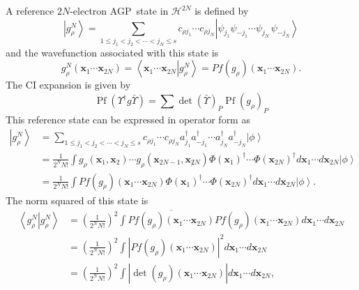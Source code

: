 \documentclass[aps,preprint]{revtex4}%
\begin{document}
A reference $2N$-electron AGP\ state in $\mathcal{H}^{2N}$ is defined by
\begin{equation}
\left\vert g_{\rho}^{N}\right\rangle =\sum_{1\leq j_{1}<j_{2}<\cdots<j_{N}\leq
s}c_{\rho j_{1}}\cdots c_{\rho j_{N}}\left\vert \psi_{j_{1}}\psi_{-j_{1}%
}\cdots\psi_{j_{N}\,}\psi_{-j_{N}}\right\rangle \label{canexp}%
\end{equation}
and the wavefunction associated with this state is
\begin{equation}
g_{\rho}^{N}\left(  \mathbf{x}_{1}\cdots\mathbf{x}_{2N}\right)  =\left\langle
\mathbf{x}_{1}\cdots\mathbf{x}_{2N}\left\vert g_{\rho}^{N}\right.
\right\rangle =Pf\left(  g_{\rho}\right)  \left(  \mathbf{x}_{1}%
\cdots\mathbf{x}_{2N}\right)  .
\end{equation}
The CI expansion is given by
\begin{equation}
\operatorname*{Pf}\left(  \Upsilon^{\dagger}g\bar{\Upsilon}\right)  =\sum
\det\left(  \bar{\Upsilon}\right)  _{P}\operatorname*{Pf}\left(  g_{\rho
}\right)  _{P}%
\end{equation}
This reference state can be expressed in operator form as
\begin{align}
\left\vert g_{\rho}^{N}\right\rangle  &  =\sum_{1\leq j_{1}<j_{2}<\cdots
<j_{N}\leq s}c_{\rho j_{1}}\cdots c_{\rho j_{N}}a_{j_{1}}^{\dagger}a_{-j_{1}%
}^{\dagger}\cdots a_{j_{N}}^{\dagger}a_{-j_{N}}^{\dagger}\left\vert
\phi\right\rangle \nonumber\\
&  =\frac{1}{2^{N}N!}\int g_{\rho}\left(  \mathbf{x}_{1},\mathbf{x}%
_{2}\right)  \cdots g_{\rho}\left(  \mathbf{x}_{2N-1},\mathbf{x}_{\not 2
N}\right)  \Phi\left(  \mathbf{x}_{1}\right)  ^{\dagger}\cdots\Phi\left(
\mathbf{x}_{2N}\right)  ^{\dagger}d\mathbf{x}_{1}\cdots d\mathbf{x}%
_{2N}\left\vert \phi\right\rangle \nonumber\\
&  =\frac{1}{2^{N}N!}\int Pf\left(  g_{\rho}\right)  \left(  \mathbf{x}%
_{1}\cdots\mathbf{x}_{2N}\right)  \Phi\left(  \mathbf{x}_{1}\right)
^{\dagger}\cdots\Phi\left(  \mathbf{x}_{2N}\right)  ^{\dagger}d\mathbf{x}%
_{1}\cdots d\mathbf{x}_{2N}\left\vert \phi\right\rangle .
\end{align}
The norm squared of this state is
\begin{align}
\left\langle g_{\rho}^{N}\left\vert g_{\rho}^{N}\right.  \right\rangle  &
=\left(  \frac{1}{2^{N}N!}\right)  ^{2}\int\overline{Pf\left(  g_{\rho
}\right)  \left(  \mathbf{x}_{1}\cdots\mathbf{x}_{2N}\right)  }Pf\left(
g_{\rho}\right)  \left(  \mathbf{x}_{1}\cdots\mathbf{x}_{2N}\right)
d\mathbf{x}_{1}\cdots d\mathbf{x}_{2N}\nonumber\\
&  =\left(  \frac{1}{2^{N}N!}\right)  ^{2}\int\left\vert Pf\left(  g_{\rho
}\right)  \left(  \mathbf{x}_{1}\cdots\mathbf{x}_{2N}\right)  \right\vert
^{2}d\mathbf{x}_{1}\cdots d\mathbf{x}_{2N}\nonumber\\
&  =\left(  \frac{1}{2^{N}N!}\right)  ^{2}\int\left\vert \det\left(  g_{\rho
}\right)  \left(  \mathbf{x}_{1}\cdots\mathbf{x}_{2N}\right)  \right\vert
d\mathbf{x}_{1}\cdots d\mathbf{x}_{2N},
\end{align}
\end{document}
